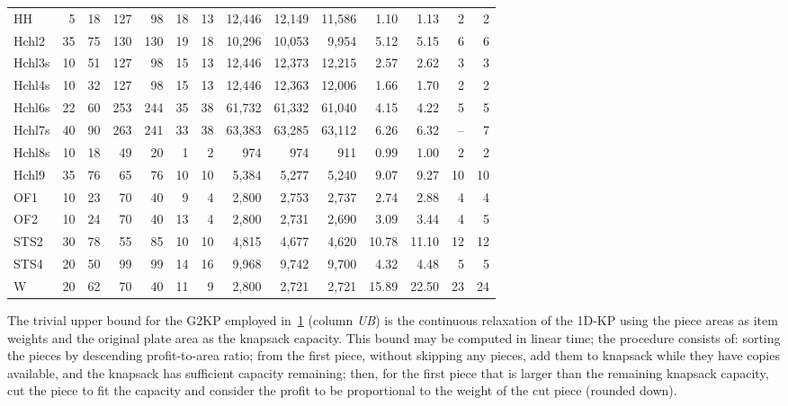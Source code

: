 \documentclass[9pt]{entcs}
\begin{document}
\begin{table}[ht]
\begin{tabular}{@{\extracolsep{4pt}}lrrrrrrrrrrrrr@{}}
HH & 5 & 18 & 127 & 98 & 18 & 13 & 12,446 & 12,149 & 11,586 & 1.10 & 1.13 & 2 & 2 \\
Hchl2 & 35 & 75 & 130 & 130 & 19 & 18 & 10,296 & 10,053 & 9,954 & 5.12 & 5.15 & 6 & 6 \\
Hchl3s & 10 & 51 & 127 & 98 & 15 & 13 & 12,446 & 12,373 & 12,215 & 2.57 & 2.62 & 3 & 3 \\
Hchl4s & 10 & 32 & 127 & 98 & 15 & 13 & 12,446 & 12,363 & 12,006 & 1.66 & 1.70 & 2 & 2 \\
Hchl6s & 22 & 60 & 253 & 244 & 35 & 38 & 61,732 & 61,332 & 61,040 & 4.15 & 4.22 & 5 & 5 \\
Hchl7s & 40 & 90 & 263 & 241 & 33 & 38 & 63,383 & 63,285 & 63,112 & 6.26 & 6.32 & -- & 7 \\
Hchl8s & 10 & 18 & 49 & 20 & 1 & 2 & 974 & 974 & 911 & 0.99 & 1.00 & 2 & 2 \\
Hchl9 & 35 & 76 & 65 & 76 & 10 & 10 & 5,384 & 5,277 & 5,240 & 9.07 & 9.27 & 10 & 10 \\
OF1 & 10 & 23 & 70 & 40 & 9 & 4 & 2,800 & 2,753 & 2,737 & 2.74 & 2.88 & 4 & 4 \\
OF2 & 10 & 24 & 70 & 40 & 13 & 4 & 2,800 & 2,731 & 2,690 & 3.09 & 3.44 & 4 & 5 \\
STS2 & 30 & 78 & 55 & 85 & 10 & 10 & 4,815 & 4,677 & 4,620 & 10.78 & 11.10 & 12 & 12 \\
STS4 & 20 & 50 & 99 & 99 & 14 & 16 & 9,968 & 9,742 & 9,700 & 4.32 & 4.48 & 5 & 5 \\
W & 20 & 62 & 70 & 40 & 11 & 9 & 2,800 & 2,721 & 2,721 & 15.89 & 22.50 & 23 & 24 \\\hline\hline
\end{tabular}
\label{tab:instances}
\end{table}


The trivial upper bound for the G2KP employed in~\cref{tab:instances} (column \emph{UB}) is the continuous relaxation of the 1D-KP using the piece areas as item weights and the original plate area as the knapsack capacity.
This bound may be computed in linear time; the procedure consists of: sorting the pieces by descending profit-to-area ratio; from the first piece, without skipping any pieces, add them to knapsack while they have copies available, and the knapsack has sufficient capacity remaining; then, for the first piece that is larger than the remaining knapsack capacity, cut the piece to fit the capacity and consider the profit to be proportional to the weight of the cut piece (rounded down).
\end{document}
